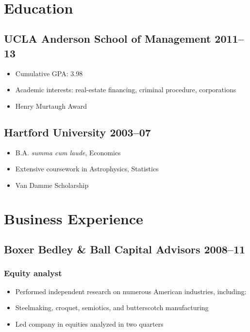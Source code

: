 \documentclass{article}
\begin{document}
	\begin{center}
    {\sffamily\LARGE\bfseries {}} \par\bigskip
		
		\sffamily\footnotesize {} \\ \medskip
		 \par\bigskip
	\end{center}

	\section{Education}
	\subsection{UCLA Anderson School of Management \hfill 2011–13}
	\begin{itemize}
		\item Cumulative GPA: 3.98
		\item Academic interests: real-estate financing, criminal procedure, corporations
		\item Henry Murtaugh Award
	\end{itemize}
	
	\subsection{Hartford University \hfill 2003–07}
	\begin{itemize}
		\item B.A. \textit{summa cum laude}, Economics
		\item Extensive coursework in Astrophysics, Statistics
		\item Van Damme Scholarship
	\end{itemize}

	
\section{Business Experience}
	\subsection{Boxer Bedley \& Ball Capital Advisors \hfill 2008–11}
	\subsubsection{Equity analyst}
	\begin{itemize}
		\item Performed independent research on numerous American industries, including:
		\item Steelmaking, croquet, semiotics, and butterscotch manufacturing
		\item Led company in equities analyzed in two quarters
	\end{itemize}
\end{document}
